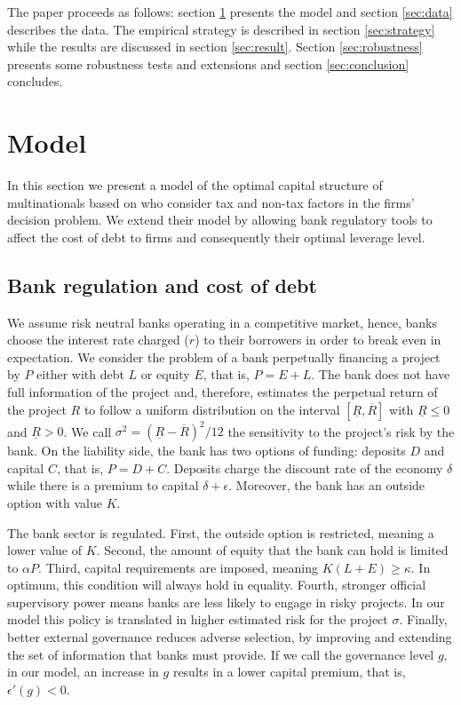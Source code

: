 \documentclass[12pt]{article}
\begin{document}
	The paper proceeds as follows: section \ref{sec:model} presents the model and section \ref{sec:data} describes the data. The empirical strategy is described in section \ref{sec:strategy} while the results are discussed in section \ref{sec:result}. Section \ref{sec:robustness} presents some robustness tests and extensions and section \ref{sec:conclusion} concludes. 
	
		\section{Model} \label{sec:model}
	In this section we present a model of the optimal capital structure of multinationals based on \cite{huizinga2008capital} who consider tax and non-tax factors in the firms' decision problem. We extend their model by allowing bank regulatory tools to affect the cost of debt to firms and consequently their optimal leverage level.  
	\subsection{Bank regulation and cost of debt}
	\label{subsec:bank}
	We assume risk neutral banks operating in a competitive market, hence, banks choose the interest rate charged ($r$) to their borrowers in order to break even in expectation. We consider the problem of a bank perpetually financing a project by $P$ either with debt $L$ or equity $E$, that is, $P=E+L$. The bank does not have full information of the project and, therefore, estimates the perpetual return of the project $R$ to follow a uniform distribution on the interval $[\underline{R},\overline{R}]$ with $\underline{R}\leq0$ and $\underline{R}>0$. We call $\sigma^2=(\underline{R}-\overline{R})^2/12$ the sensitivity to the project's risk by the bank. On the liability side, the bank has two options of funding: deposits $D$ and capital $C$, that is, $P=D+C$. Deposits charge the discount rate of the economy $\delta$ while there is a premium to capital $\delta+\epsilon$. Moreover, the bank has an outside option with value $K$.
	
	The bank sector is regulated. First, the outside option is restricted, meaning a lower value of $K$. Second, the amount of equity that the bank can hold is limited to $\alpha P$. Third, capital requirements are imposed, meaning $K(L+E)\ge\kappa$. In optimum, this condition will always hold in equality. Fourth, stronger official supervisory power means banks are less likely to engage in risky projects. In our model this policy is translated in higher estimated risk for the project $\sigma$. Finally, better external governance reduces adverse selection, by improving and extending the set of information that banks must provide. If we call the governance level $g$, in our model, an increase in $g$ results in a lower capital premium, that is, $\epsilon'(g)<0$.
	
\end{document}
